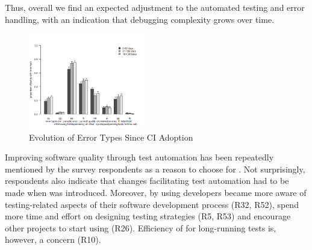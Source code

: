 Thus, overall we find an expected adjustment to the automated testing and 
error handling, with an indication that debugging complexity grows over time.



\begin{figure}[!t]
	\centering
	\includegraphics[width=0.45\textwidth, clip=true, trim=0 15 15 50]{new_plot_together.png}
	\caption{Evolution of Error Types Since CI Adoption}
	\label{Fig:BugTypes}
\end{figure}

Improving software quality through test automation has been repeatedly mentioned by the survey respondents as a reason to choose for \Tvis. 
Not surprisingly, respondents also indicate that changes facilitating test automation had to be made when \Tvis was introduced. 
Moreover, by using \Tvis developers became more aware of testing-related aspects of their software development process (R32, R52), 
spend more time and effort on designing testing strategies (R5, R53) and encourage other projects to start using \Tvis (R26).
Efficiency of \Tvis for long-running tests is, however, a concern (R10).

